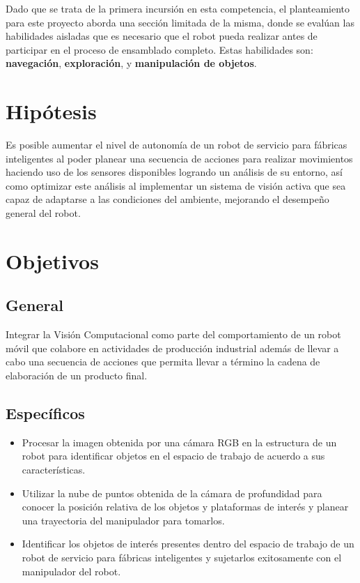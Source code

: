 Dado que se trata de la primera incursión en esta competencia, el planteamiento para este proyecto aborda una sección limitada de la misma, donde se evalúan las habilidades aisladas que es necesario que el robot pueda realizar antes de participar en el proceso de ensamblado completo. Estas habilidades son: \textbf{navegación}, \textbf{exploración}, y \textbf{manipulación de objetos}. 

\section{Hipótesis}
Es posible aumentar el nivel de autonomía de un robot de servicio para fábricas inteligentes al poder planear una secuencia de acciones para realizar movimientos haciendo uso de los sensores disponibles logrando un análisis de su entorno, así como optimizar este análisis al implementar un sistema de visión activa que sea capaz de adaptarse a las condiciones del ambiente, mejorando el desempeño general del robot.

\section{Objetivos}
\subsection{General}
Integrar la Visión Computacional como parte del comportamiento de un robot móvil que colabore en actividades de producción industrial además de  llevar a cabo una secuencia de acciones que permita llevar a término la cadena de elaboración de un producto final.
\subsection{Específicos}
\begin{itemize}
    \item Procesar la imagen obtenida por una cámara RGB en la estructura de un robot para identificar objetos en el espacio de trabajo de acuerdo a sus características.
    \item Utilizar la nube de puntos  obtenida de la cámara de profundidad para conocer la posición relativa de los objetos y plataformas de interés y planear una trayectoria del manipulador para tomarlos. 
    \item Identificar los objetos de interés presentes dentro del espacio de trabajo de un robot de servicio para fábricas inteligentes y sujetarlos exitosamente con el manipulador del robot.
\end{itemize}
